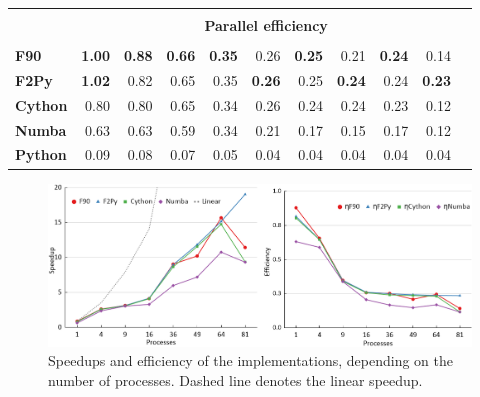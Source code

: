 \documentclass[12pt]{article}
\newcommand{\red}[1]{\textbf{\color{red}#1}}
\newcommand{\blue}[1]{\textbf{\color{blue}#1}}
\begin{document}
\begin{table}
\begin{tabular}{lrrrrrrrrrr}
\hline\vspace{-9pt} & & & & & & & & & \\
&\multicolumn{9}{c}{\textbf{Parallel efficiency}} \\
\hline\vspace{-9pt} & & & & & & & & & \\
\textbf{F90} &\blue{1.00} &\red{0.88} &\red{0.66} &\red{0.35} &0.26 &\red{0.25} &0.21 &\red{0.24} &0.14 \\
\textbf{F2Py} &\red{1.02} &0.82 &0.65 &0.35 &\red{0.26} &0.25 &\red{0.24} &0.24 &\red{0.23} \\
\textbf{Cython} &0.80 &0.80 &0.65 &0.34 &0.26 &0.24 &0.24 &0.23 &0.12 \\
\textbf{Numba} &0.63 &0.63 &0.59 &0.34 &0.21 &0.17 &0.15 &0.17 &0.12 \\
\textbf{Python} &0.09 &0.08 &0.07 &0.05 &0.04 &0.04 &0.04 &0.04 &0.04 \\
\bottomrule
\end{tabular}
\end{table}

\begin{figure}[ht]
    \centering
    \includegraphics[clip,width=\linewidth]{img/effispee2.png}
    \caption{Speedups and efficiency of the implementations, depending on the number of processes. Dashed line denotes the linear speedup.}
    \label{fig:speedup}
\end{figure}
\end{document}
